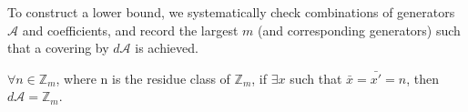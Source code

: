 To construct a lower bound, we systematically check combinations of generators $\mathcal{A}$ and coefficients, and record the largest $m$ (and corresponding generators) such that a covering by $d \mathcal{A}$ is achieved.

$\forall n \in \mathbb{Z}_{m}$, where n is the residue class of $\mathbb{Z}_{m}$, if $\exists  x$ such that $\bar{x} = \bar{x'}= n$, then $d \mathcal{A} = \mathbb{Z}_{m}$.\n


